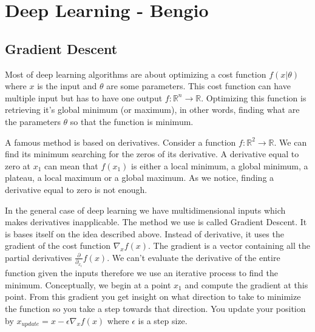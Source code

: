 	



\section{Deep Learning - Bengio}
\label{sec:deep_learning}	

	\subsection{Gradient Descent}
		Most of deep learning algorithms are about optimizing a cost function $f(x|\theta)$ where $x$ is the input and $\theta$ are some parameters. This cost function can have multiple input but has to have one output $f:\mathbb{R}^n\rightarrow \mathbb{R}$. Optimizing this function is retrieving it's global minimum (or maximum), in other words, finding what are the parameters $\theta$ so that the function is minimum. 

		A famous method is based on derivatives. Consider a function $f:\mathbb{R}^2 \rightarrow \mathbb{R}$. We can find its minimum searching for the zeros of its derivative. A derivative equal to zero at $x_1$ can mean that $f(x_1)$ is either a local minimum, a global minimum, a plateau, a local maximum or a global maximum. As we notice, finding a derivative equal to zero is not enough.

		In the general case of deep learning we have multidimensional inputs which makes derivatives inapplicable. The method we use is called Gradient Descent. It is bases itself on the idea described above. Instead of derivative, it uses the gradient of the cost function $\nabla_x f(x)$. The gradient is a vector containing all the partial derivatives $\frac{\partial}{\partial_{x_i}}f(x)$. We can't evaluate the derivative of the entire function given the inputs therefore we use an iterative process to find the minimum. Conceptually, we begin at a point $x_1$ and compute the gradient at this point. From this gradient you get insight on what direction to take to minimize the function so you take a step towards that direction. You update your position by $x_{update} = x - \epsilon \nabla_x f(x)$ where $\epsilon$ is a step size.


